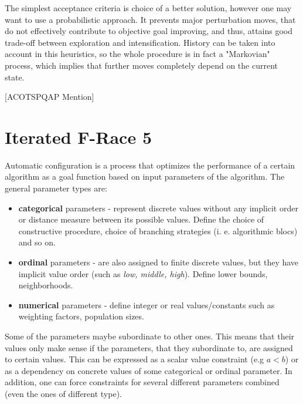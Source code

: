 \documentclass[11pt,a4paper,oneside]{book}
\begin{document}
The simplest acceptance criteria is choice of a better solution, however one may want to use a probabilistic approach. It prevents   major perturbation moves, that do not effectively contribute to objective goal improving, and thus, attains good trade-off between exploration and intensification. History can be taken into account in this heuristics, so the whole procedure is in fact a "Markovian" process, which implies that further moves completely depend on the current state.




[ACOTSPQAP Mention] \newline

\section{Iterated F-Race 5}

Automatic configuration is a process that optimizes the performance of a certain algorithm as a goal function based on input parameters of the algorithm. The general parameter types are:
 
\begin{itemize}
\item \textbf{categorical} parameters - represent discrete values without any implicit order or distance measure between its possible values. Define the choice of constructive procedure, choice of branching strategies (i. e. algorithmic blocs) and so on.
\item \textbf{ordinal} parameters - are also assigned to finite discrete values, but they have implicit value order (such as \emph{low, middle, high}). Define lower bounds, neighborhoods.
\item \textbf{numerical} parameters - define integer or real values/constants such as weighting factors, population sizes.
\end{itemize}

Some of the parameters maybe subordinate to other ones. This means that their values only make sense if the parameters, that they subordinate to, are assigned to certain values. This can be expressed as a scalar value constraint (e.g $a < b$) or as a dependency on concrete values of some categorical or ordinal parameter. In addition, one can force constraints for several different parameters combined (even the ones of different type).
\end{document}
